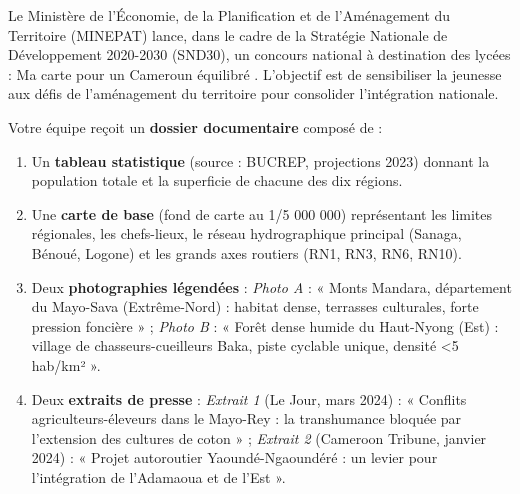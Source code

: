 \documentclass[11pt]{article}
\newcommand{\cle}[1]{{\popxbold\color{popdark}#1}}
\newcounter{popsec}
\newcounter{popsub}
\newcommand{\courssub}[1]{%
  \stepcounter{popsub}%
  \par\vspace{9pt}\noindent{\popxbold\fontsize{11.5}{13}\selectfont\color{popink}{\color{poporange}\thepopsec.\thepopsub}\hspace{6pt}#1}\par\nopagebreak\vspace{4pt}
}
\begin{document}
\courssub{Situation}
Le Ministère de l'Économie, de la Planification et de l'Aménagement du Territoire (MINEPAT) lance, dans le cadre de la \cle{Stratégie Nationale de Développement 2020-2030 (SND30)}, un concours national à destination des lycées : \og Ma carte pour un Cameroun équilibré \fg. L'objectif est de sensibiliser la jeunesse aux défis de l'aménagement du territoire pour consolider l'\cle{intégration nationale}.

Votre équipe reçoit un \textbf{dossier documentaire} composé de :
\begin{enumerate}
    \item Un \textbf{tableau statistique} (source : BUCREP, projections 2023) donnant la population totale et la superficie de chacune des dix régions.
    \item Une \textbf{carte de base} (fond de carte au 1/5 000 000) représentant les limites régionales, les chefs-lieux, le réseau hydrographique principal (Sanaga, Bénoué, Logone) et les grands axes routiers (RN1, RN3, RN6, RN10).
    \item Deux \textbf{photographies légendées} : \textit{Photo A} : « Monts Mandara, département du Mayo-Sava (Extrême-Nord) : habitat dense, terrasses culturales, forte pression foncière » ; \textit{Photo B} : « Forêt dense humide du Haut-Nyong (Est) : village de chasseurs-cueilleurs Baka, piste cyclable unique, densité \textless 5 hab/km² ».
    \item Deux \textbf{extraits de presse} : \textit{Extrait 1} (Le Jour, mars 2024) : « Conflits agriculteurs-éleveurs dans le Mayo-Rey : la transhumance bloquée par l'extension des cultures de coton » ; \textit{Extrait 2} (Cameroon Tribune, janvier 2024) : « Projet autoroutier Yaoundé-Ngaoundéré : un levier pour l'intégration de l'Adamaoua et de l'Est ».
\end{enumerate}
\end{document}
